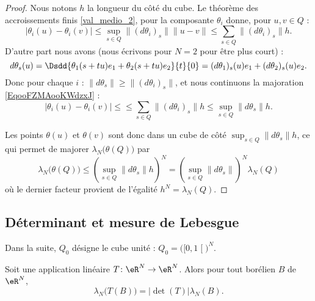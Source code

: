 \begin{proof}
    Nous notons \( h\) la longueur du côté du cube. Le théorème des accroissements finis \ref{val_medio_2}, pour la composante \( \theta_i\) donne, pour \( u,v\in Q\) :
    \begin{equation}        \label{EqooFZMAooKWdzxJ}
        \big|  \theta_i(u)-\theta_i(v) \big|\leq\sup_{s\in Q}\| (d\theta_i)_s \|\| u-v \|\leq \sum_{s\in Q}\| (d\theta_i)_s \|h.
    \end{equation}
    D'autre part nous avons (nous écrivons pour \( N=2\) pour être plus court) :
    \begin{equation}
        d\theta_s(u)=\Dsdd{ \theta_1(s+tu)e_1+\theta_2(s+tu)e_2 }{t}{0}=(d\theta_1)_s(u)e_1+(d\theta_2)_s(u)e_2.
    \end{equation}
    Donc pour chaque \( i\) : \( \| d\theta_s \|\geq \| (d\theta_i)_s \|\), et nous continuons la majoration \eqref{EqooFZMAooKWdzxJ} :
    \begin{equation}
        \big|  \theta_i(u)-\theta_i(v) \big|\leq\leq \sum_{s\in Q}\| (d\theta_i)_s \|h\leq \sup_{s\in Q}\| d\theta_s \|h.
    \end{equation}
    
    Les points \( \theta(u)\) et \( \theta(v)\) sont donc dans un cube de côté \( \sup_{s\in Q}\| d\theta_s \|h\), ce qui permet de majorer \( \lambda_N\big( \theta(Q) \big)\) par
    \begin{equation}
        \lambda_N\big( \theta(Q) \big)\leq \left( \sup_{s\in Q}\| d\theta_s \|h \right)^N=\left( \sup_{s\in Q}\| d\theta_s \| \right)^N\lambda_N(Q)
    \end{equation}
    où le dernier facteur provient de l'égalité \( h^N=\lambda_N(Q)\).
\end{proof}

\subsection{Déterminant et mesure de Lebesgue}

Dans la suite, \( Q_0\) désigne le cube unité : \( Q_0=\big( \mathopen[ 0 , 1 \mathclose[ \big)^N\).

\begin{theorem}    \label{ThoBVIJooMkifod}
    Soit une application linéaire \( T\colon \eR^N\to \eR^N\). Alors pour tout borélien \( B\) de \( \eR^N\),
    \begin{equation}
        \lambda_N\big( T(B) \big)=| \det(T) |\lambda_N(B).
    \end{equation}
\end{theorem}

